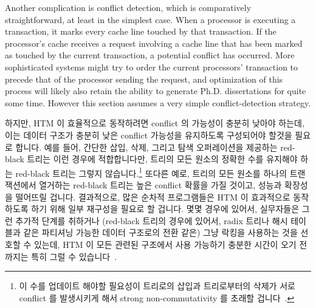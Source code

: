 Another complication is conflict detection, which is comparatively
straightforward, at least in the simplest case.
When a processor is executing a transaction, it marks every cache line
touched by that transaction.
If the processor's cache receives a request involving a cache line that
has been marked as touched by the current transaction, a potential
conflict has occurred.
More sophisticated systems might try to order the current processors'
transaction to precede that of the processor sending the request,
and optimization of this process will likely also retain the ability
to generate Ph.D. dissertations for quite some time.
However this section assumes a very simple conflict-detection strategy.
\fi

하지만, HTM 이 효율적으로 동작하려면 conflict 의 가능성이 충분히 낮아야 하는데,
이는 데이터 구조가 충분히 낮은 conflict 가능성을 유지하도록 구성되어야 할것을
필요로 합니다.
예를 들어, 간단한 삽입, 삭제, 그리고 탐색 오퍼레이션을 제공하는 red-black
트리는 이런 경우에 적합합니다만, 트리의 모든 원소의 정확한 수를 유지해야 하는
red-black 트리는 그렇지 않습니다.\footnote{
	이 수를 업데이트 해야할 필요성이 트리로의 삽입과 트리로부터의 삭제가
	서로 conflict 를 발생시키게 해서 strong non-commutativity 를 초래할
	겁니다~\cite{HagitAttiya2011LawsOfOrder,Attiya:2011:LOE:1925844.1926442,PaulEMcKenney2011SNC}.}
또다른 예로, 트리의 모든 원소를 하나의 트랜잭션에서 열거하는 red-black 트리는
높은 conflict 확률을 가질 것이고, 성능과 확장성을 떨어뜨릴 겁니다.
결과적으로, 많은 순차적 프로그램들은 HTM 이 효과적으로 동작하도록 하기 위해
일부 재구성을 필요로 할 겁니다.
몇몇 경우에 있어서, 실무자들은 그런 추가적 단계를 취하거나 (red-black 트리의
경우에 있어서, radix 트리나 해시 테이블과 같은 파티셔닝 가능한 데이터 구조로의
전환 같은) 그냥 락킹을 사용하는 것을 선호할 수 있는데, HTM 이 모든 관련된
구조에서 사용 가능하기 충분한 시간이 오기 전까지는 특히 그럴 수
있습니다~\cite{CliffClick2009AzulHTM}.
\iffalse

However, for HTM to work effectively, the probability of conflict must
be suitably low, which in turn requires that the data structures
be organized so as to maintain a sufficiently low probability of conflict.
For example, a red-black tree with simple insertion, deletion, and search
operations fits this description, but a red-black
tree that maintains an accurate count of the number of elements in
the tree does not.\footnote{
	The need to update the count would result in additions to and
	deletions from the tree conflicting with each other, resulting
	in strong non-commutativity~\cite{HagitAttiya2011LawsOfOrder,Attiya:2011:LOE:1925844.1926442,PaulEMcKenney2011SNC}.}
For another example, a red-black tree that enumerates all elements in
the tree in a single transaction will have high conflict probabilities,
degrading performance and scalability.
As a result, many serial programs will require some restructuring before
HTM can work effectively.
In some cases, practitioners will prefer to take the extra steps
(in the red-black-tree case, perhaps switching to a partitionable
data structure such as a radix tree or a hash table), and just
use locking, particularly during the time before HTM is readily available
on all relevant
architectures~\cite{CliffClick2009AzulHTM}.
\fi

